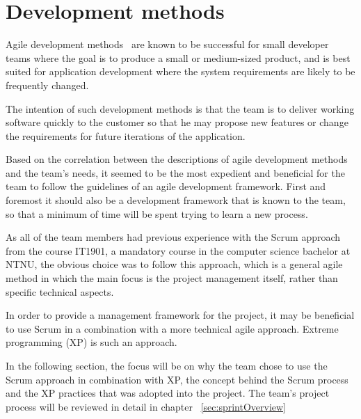 \section{Development methods}

Agile development methods~\cite{scrum} are known to be successful for small developer teams where the goal is to produce a small or medium-sized product, and is best suited for application development where the system requirements are likely to be frequently changed.

The intention of such development methods is that the team is to deliver working software quickly to the customer so that he may propose new features or change the requirements for future iterations of the application.

Based on the correlation between the descriptions of agile development methods and the team's needs, it seemed to be the most expedient and beneficial for the team to follow the guidelines of an agile development framework. First and foremost it should also be a development framework that is known to the team, so that a minimum of time will be spent trying to learn a new process.

As all of the team members had previous experience with the Scrum approach from the course IT1901, a mandatory course in the computer science bachelor at NTNU, the obvious choice was to follow this approach, which is a general agile method in which the main focus is the project management itself, rather than specific technical aspects.

In order to provide a management framework for the project, it may be beneficial to use Scrum in a combination with a more technical agile approach. Extreme programming (XP) is such an approach.

In the following section, the focus will be on why the team chose to use the Scrum approach in combination with XP, the concept behind the Scrum process and the XP practices that was adopted into the project. The team's project process will be reviewed in detail in chapter ~\ref{sec:sprintOverview}